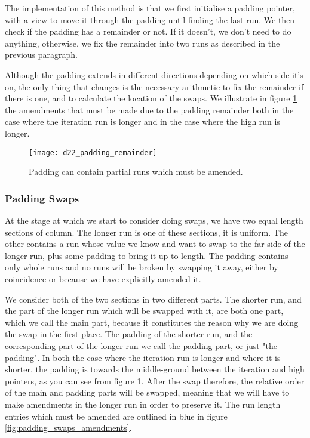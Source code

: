 The implementation of this method is that we first initialise a padding pointer, with a view to move it through the padding until finding the last run. We then check if the padding has a remainder or not. If it doesn't, we don't need to do anything, otherwise, we fix the remainder into two runs as described in the previous paragraph.

Although the padding extends in different directions depending on which side it's on, the only thing that changes is the necessary arithmetic to fix the remainder if there is one, and to calculate the location of the swaps. We illustrate in figure \ref{fig:padding_remainder} the amendments that must be made due to the padding remainder both in the case where the iteration run is longer and in the case where the high run is longer. 

\begin{figure}[H]
  \centering
  \texttt{[image: d22\_padding\_remainder]}
  \caption{Padding can contain partial runs which must be amended.}
  \label{fig:padding_remainder}
\end{figure}

\subsubsection{Padding Swaps}

At the stage at which we start to consider doing swaps, we have two equal length sections of column. The longer run is one of these sections, it is uniform. The other contains a run whose value we know and want to swap to the far side of the longer run, plus some padding to bring it up to length. The padding contains only whole runs and no runs will be broken by swapping it away, either by coincidence or because we have explicitly amended it.

We consider both of the two sections in two different parts. The shorter run, and the part of the longer run which will be swapped with it, are both one part, which we call the main part, because it constitutes the reason why we are doing the swap in the first place. The padding of the shorter run, and the corresponding part of the longer run we call the padding part, or just "the padding". In both the case where the iteration run is longer and where it is shorter, the padding is towards the middle-ground between the iteration and high pointers, as you can see from figure \ref{fig:padding_remainder}. After the swap therefore, the relative order of the main and padding parts will be swapped, meaning that we will have to make amendments in the longer run in order to preserve it. The run length entries which must be amended are outlined in blue in figure \ref{fig:padding_swaps_amendments}.


